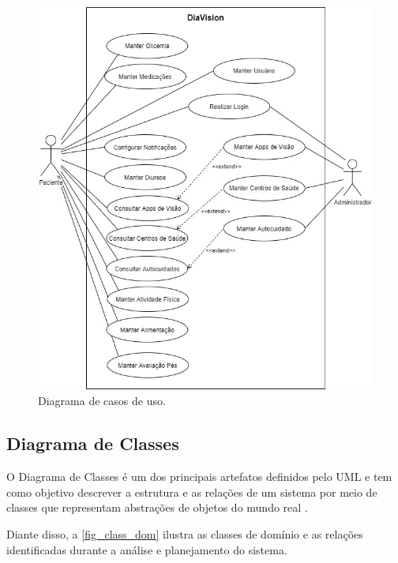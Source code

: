 \begin{figure}[htb]
    \caption{\label{fig_use_cas}Diagrama de casos de uso.}
    \begin{center}
        \includegraphics[scale=0.65]{Imagens/proposta/use_case.jpg}
    \end{center}
\end{figure}

\newpage

\subsection{Diagrama de Classes}

O  Diagrama de Classes é um dos principais artefatos definidos pelo UML e tem como objetivo
descrever a estrutura e as relações de um sistema por meio de classes que representam abstrações
de objetos do mundo real \cite{guedes2018uml}.

Diante disso, a \autoref{fig_class_dom} ilustra as classes de domínio e as relações identificadas
durante a análise e planejamento do sistema.

